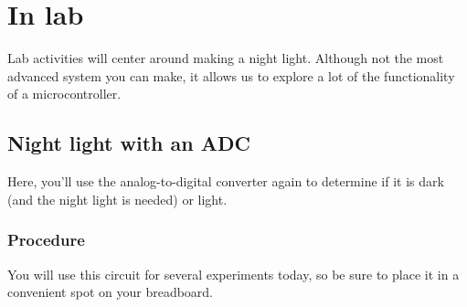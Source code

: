 \documentclass[11pt]{article} %
\begin{document}
\section*{In lab}

Lab activities will center around making a night light. Although not the most advanced system you can make, it allows us to explore a lot of the functionality of a microcontroller.

\subsection*{Night light with an ADC}

Here, you’ll use the analog-to-digital converter again to determine if it is dark (and the night light is needed) or light.

\subsubsection*{Procedure}

You will use this circuit for several experiments today, so be sure to place it in a convenient spot on your breadboard.
\end{document}
